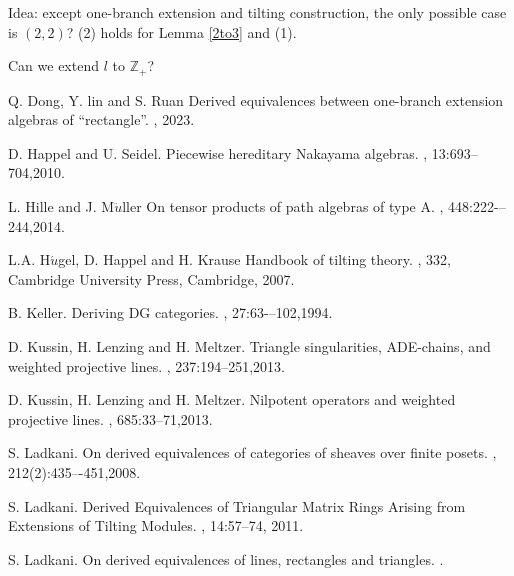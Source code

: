\documentclass[a4paper, reqno]{amsart}
\theoremstyle{definition}
\theoremstyle{remark}
\numberwithin{equation}{section}
\begin{document}
{\color{blue}Idea: except one-branch extension and tilting construction, the only possible case is $(2,2)$? (2) holds for Lemma \ref{2to3} and (1).}

{\color{red}Can we extend $l$ to $\mathbb{Z}_{+}$?}





\begin{thebibliography}{1}

Q. Dong, Y. lin and S. Ruan
\newblock Derived equivalences between one-branch extension algebras of ``rectangle''.
, 2023.

D. Happel and U. Seidel. 
\newblock Piecewise hereditary Nakayama algebras. , 13:693--704,2010.

L. Hille and J. M$\ddot{u}$ller
\newblock On tensor products of path algebras of type A.
, 448:222-–244,2014.

L.A. H$\acute{u}$gel, D. Happel and H. Krause
\newblock Handbook of tilting theory.
, 332, Cambridge University Press, Cambridge, 2007. 

B. Keller.
\newblock  Deriving DG categories.
, 27:63-–102,1994.

D. Kussin, H. Lenzing and H. Meltzer. 
\newblock Triangle singularities, ADE-chains, and weighted projective lines. 
, 237:194--251,2013.

D. Kussin, H. Lenzing and H. Meltzer. 
\newblock Nilpotent operators and weighted projective lines.
, 685:33--71,2013.

S. Ladkani.
\newblock On derived equivalences of categories of sheaves over finite posets.
, 212(2):435–-451,2008.

S. Ladkani.
\newblock Derived Equivalences of Triangular Matrix Rings Arising from Extensions of Tilting Modules.
, 14:57--74, 2011.

S. Ladkani.
\newblock On derived equivalences of lines, rectangles and triangles.
\newblock {\em }.


\end{thebibliography}
\end{document}

